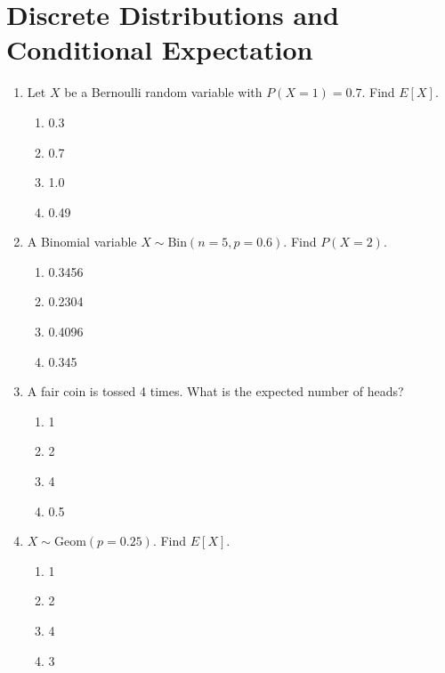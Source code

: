 \section{Discrete Distributions and Conditional Expectation}


\begin{enumerate}

\item Let \(X\) be a Bernoulli random variable with \(P(X=1)=0.7\). Find \(E[X]\).

\begin{enumerate}[label=(\alph*)]
\item 0.3 \quad \item 0.7 \quad \item 1.0 \quad \item 0.49
\end{enumerate}

\item A Binomial variable \(X \sim \text{Bin}(n=5, p=0.6)\). Find \(P(X=2)\).

\begin{enumerate}[label=(\alph*)]
\item 0.3456 \quad \item 0.2304 \quad \item 0.4096 \quad \item 0.345
\end{enumerate}

\item A fair coin is tossed 4 times. What is the expected number of heads?

\begin{enumerate}[label=(\alph*)]
\item 1 \quad \item 2 \quad \item 4 \quad \item 0.5
\end{enumerate}

\item \(X \sim \text{Geom}(p=0.25)\). Find \(E[X]\).

\begin{enumerate}[label=(\alph*)]
\item 1 \quad \item 2 \quad \item 4 \quad \item 3
\end{enumerate}


\end{enumerate}
